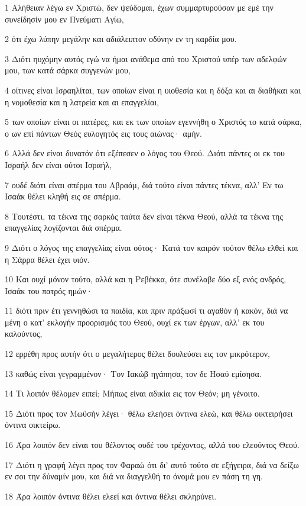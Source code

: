 \par 1 Αλήθειαν λέγω εν Χριστώ, δεν ψεύδομαι, έχων συμμαρτυρούσαν με εμέ την συνείδησίν μου εν Πνεύματι Αγίω,
\par 2 ότι έχω λύπην μεγάλην και αδιάλειπτον οδύνην εν τη καρδία μου.
\par 3 Διότι ηυχόμην αυτός εγώ να ήμαι ανάθεμα από του Χριστού υπέρ των αδελφών μου, των κατά σάρκα συγγενών μου,
\par 4 οίτινες είναι Ισραηλίται, των οποίων είναι η υιοθεσία και η δόξα και αι διαθήκαι και η νομοθεσία και η λατρεία και αι επαγγελίαι,
\par 5 των οποίων είναι οι πατέρες, και εκ των οποίων εγεννήθη ο Χριστός το κατά σάρκα, ο ων επί πάντων Θεός ευλογητός εις τους αιώνας· αμήν.
\par 6 Αλλά δεν είναι δυνατόν ότι εξέπεσεν ο λόγος του Θεού. Διότι πάντες οι εκ του Ισραήλ δεν είναι ούτοι Ισραήλ,
\par 7 ουδέ διότι είναι σπέρμα του Αβραάμ, διά τούτο είναι πάντες τέκνα, αλλ' Εν τω Ισαάκ θέλει κληθή εις σε σπέρμα.
\par 8 Τουτέστι, τα τέκνα της σαρκός ταύτα δεν είναι τέκνα Θεού, αλλά τα τέκνα της επαγγελίας λογίζονται διά σπέρμα.
\par 9 Διότι ο λόγος της επαγγελίας είναι ούτος· Κατά τον καιρόν τούτον θέλω ελθεί και η Σάρρα θέλει έχει υιόν.
\par 10 Και ουχί μόνον τούτο, αλλά και η Ρεβέκκα, ότε συνέλαβε δύο εξ ενός ανδρός, Ισαάκ του πατρός ημών·
\par 11 διότι πριν έτι γεννηθώσι τα παιδία, και πριν πράξωσί τι αγαθόν ή κακόν, διά να μένη ο κατ' εκλογήν προορισμός του Θεού, ουχί εκ των έργων, αλλ' εκ του καλούντος,
\par 12 ερρέθη προς αυτήν ότι ο μεγαλήτερος θέλει δουλεύσει εις τον μικρότερον,
\par 13 καθώς είναι γεγραμμένον· Τον Ιακώβ ηγάπησα, τον δε Ησαύ εμίσησα.
\par 14 Τι λοιπόν θέλομεν ειπεί; Μήπως είναι αδικία εις τον Θεόν; μη γένοιτο.
\par 15 Διότι προς τον Μωϋσήν λέγει· θέλω ελεήσει όντινα ελεώ, και θέλω οικτειρήσει όντινα οικτείρω.
\par 16 Άρα λοιπόν δεν είναι του θέλοντος ουδέ του τρέχοντος, αλλά του ελεούντος Θεού.
\par 17 Διότι η γραφή λέγει προς τον Φαραώ ότι δι' αυτό τούτο σε εξήγειρα, διά να δείξω εν σοι την δύναμίν μου, και διά να διαγγελθή το όνομά μου εν πάση τη γη.
\par 18 Άρα λοιπόν όντινα θέλει ελεεί και όντινα θέλει σκληρύνει.
